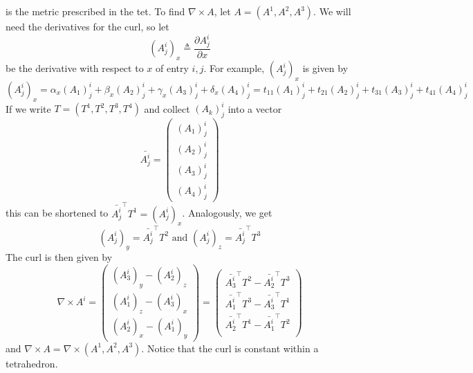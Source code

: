 \documentclass[../thesis.tex]{subfiles}
\begin{document}
is the metric prescribed in the tet. To find $\nabla \times A$, let
$A = (A^1, A^2, A^3)$. We will need the derivatives for the curl, so let
$$(A^i_j)_x \triangleq \frac{\partial A^i_j}{\partial x}$$ be the derivative with respect to $x$ of entry $i,j$.
For example, $(A^i_j)_x$ is given by
$$(A^i_j)_x = \alpha_x (A_1)^i_j + \beta_x (A_2)^i_j + \gamma_x (A_3)^i_j + \delta_x (A_4)^i_j = t_{11}(A_1)^i_j + t_{21}(A_2)^i_j + t_{31}(A_3)^i_j + t_{41}(A_4)^i_j$$
If we write $T= (T^1, T^2, T^3, T^4)$ and collect $(A_k)^i_j$ into a vector
$$\bar{A^i_j}=\begin{pmatrix}
  (A_1)^i_j \\ (A_2)^i_j \\ (A_3)^i_j \\ (A_4)^i_j
\end{pmatrix}$$
this can be shortened to $\bar{A^i_j}^{\top}T^1 = (A^i_j)_x$.
Analogously, we get
$$(A^i_j)_y = \bar{A^i_j}^{\top}T^2  \text{ and } (A^i_j)_z = \bar{A^i_j}^{\top}T^3$$
The curl is then given by
$$\nabla \times A^i = \begin{pmatrix}
  (A^i_3)_y - (A^i_2)_z \\
  (A^i_1)_z - (A^i_3)_x \\
  (A^i_2)_x - (A^i_1)_y
\end{pmatrix} =
\begin{pmatrix}
  \bar{A^i_3}^{\top}T^2 - \bar{A^i_2}^{\top}T^3\\
  \bar{A^i_1}^{\top}T^3 - \bar{A^i_3}^{\top}T^1\\
  \bar{A^i_2}^{\top}T^1 - \bar{A^i_1}^{\top}T^2\\
\end{pmatrix}$$
and $\nabla \times A = \nabla \times (A^1, A^2, A^3)$.
Notice that the curl is constant within a tetrahedron.
\end{document}
